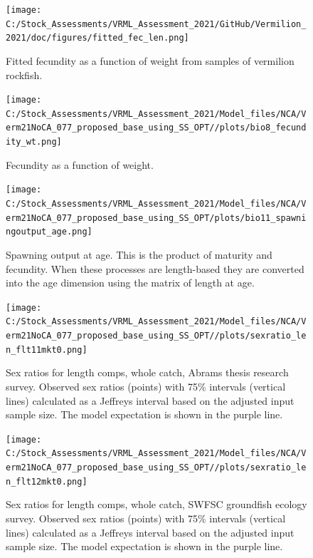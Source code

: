 \documentclass[
  english,
  a4paper,
]{article}
\begin{document}
\begin{figure}
\centering
\texttt{[image: C:/Stock\_Assessments/VRML\_Assessment\_2021/GitHub/Vermilion\_2021/doc/figures/fitted\_fec\_len.png]}
\caption{Fitted fecundity as a function of weight from samples of vermilion rockfish.\label{fig:fitted-fecundity}}
\end{figure}

\begin{figure}
\centering
\texttt{[image: C:/Stock\_Assessments/VRML\_Assessment\_2021/Model\_files/NCA/Verm21NoCA\_077\_proposed\_base\_using\_SS\_OPT//plots/bio8\_fecundity\_wt.png]}
\caption{Fecundity as a function of weight.\label{fig:fecundity}}
\end{figure}

\begin{figure}
\centering
\texttt{[image: C:/Stock\_Assessments/VRML\_Assessment\_2021/Model\_files/NCA/Verm21NoCA\_077\_proposed\_base\_using\_SS\_OPT/plots/bio11\_spawningoutput\_age.png]}
\caption{Spawning output at age. This is the product of maturity and fecundity. When these processes are length-based they are converted into the age dimension using the matrix of length at age.\label{fig:spawnage}}
\end{figure}

\FloatBarrier

\begin{figure}
\centering
\texttt{[image: C:/Stock\_Assessments/VRML\_Assessment\_2021/Model\_files/NCA/Verm21NoCA\_077\_proposed\_base\_using\_SS\_OPT//plots/sexratio\_len\_flt11mkt0.png]}
\caption{Sex ratios for length comps, whole catch, Abrams thesis research survey. Observed sex ratios (points) with 75\% intervals (vertical lines) calculated as a Jeffreys interval based on the adjusted input sample size. The model expectation is shown in the purple line.\label{fig:sexratio-ABRAMS-RESEARCH}}
\end{figure}

\begin{figure}
\centering
\texttt{[image: C:/Stock\_Assessments/VRML\_Assessment\_2021/Model\_files/NCA/Verm21NoCA\_077\_proposed\_base\_using\_SS\_OPT//plots/sexratio\_len\_flt12mkt0.png]}
\caption{Sex ratios for length comps, whole catch, SWFSC groundfish ecology survey. Observed sex ratios (points) with 75\% intervals (vertical lines) calculated as a Jeffreys interval based on the adjusted input sample size. The model expectation is shown in the purple line.\label{fig:sexratio-SWFSC-GF-ECOL}}
\end{figure}
\end{document}
